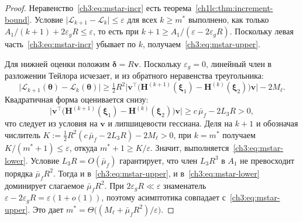 \begin{proof}
Неравенство~\eqref{ch3:eq:mstar-incr} есть теорема~\ref{ch1lc:thm:increment-bound}.
Условие $\bigl|\mathcal{L}_{k+1}-\mathcal{L}_k\bigr|\le\varepsilon$ для всех $k\ge m^*$ выполнено, как только $A_1/(k+1)+2\varepsilon_gR\le\varepsilon$, то есть при $k+1\ge A_1/(\varepsilon-2\varepsilon_gR)$.
Поскольку левая часть~\eqref{ch3:eq:mstar-incr} убывает по $k$, получаем~\eqref{ch3:eq:mstar-upper}.

Для нижней оценки положим $\boldsymbol{\delta}=R\mathbf{v}$. Поскольку $\varepsilon_g=0$, линейный член в разложении Тейлора исчезает, и из обратного неравенства треугольника:
\[
  \bigl|\mathcal{L}_{k+1}(\boldsymbol{\theta})-\mathcal{L}_k(\boldsymbol{\theta})\bigr|
  \ge\tfrac12 R^2\bigl|\mathbf{v}^{\top}\bigl(\mathbf{H}^{(k+1)}(\boldsymbol{\xi}_1)-\mathbf{H}^{(k)}(\boldsymbol{\xi}_2)\bigr)\mathbf{v}\bigr|-2M_\ell .
\]
Квадратичная форма оценивается снизу:
\[
  \bigl|\mathbf{v}^{\top}\bigl(\mathbf{H}^{(k+1)}(\boldsymbol{\xi}_1)-\mathbf{H}^{(k)}(\boldsymbol{\xi}_2)\bigr)\mathbf{v}\bigr|
  \ge c\,\bar\mu_f-2L_3R>0 ,
\]
что следует из условия на $\mathbf{v}$ и липшицевости гессиана.
Деля на $k+1$ и обозначая числитель $K:=\tfrac12 R^2(c\,\bar\mu_f-2L_3R)-2M_\ell>0$, при $k=m^*$ получаем $K/(m^*+1)\le\varepsilon$, откуда $m^*+1\ge K/\varepsilon$.
Значит, выполняется~\eqref{ch3:eq:mstar-lower}.
Условие $L_3R=O(\bar\mu_f)$ гарантирует, что член $L_3R^3$ в $A_1$ не превосходит порядка $\bar\mu_f R^2$.
Тогда и в~\eqref{ch3:eq:mstar-upper}, и в~\eqref{ch3:eq:mstar-lower} доминирует слагаемое $\bar\mu_f R^2$.
При $2\varepsilon_gR\ll\varepsilon$ знаменатель $\varepsilon-2\varepsilon_gR=\varepsilon(1+o(1))$, поэтому асимптотика совпадает с~\eqref{ch3:eq:mstar-upper}.
Это дает $m^*=\Theta\bigl((M_\ell+\bar\mu_f R^2)/\varepsilon\bigr)$. \end{proof}

